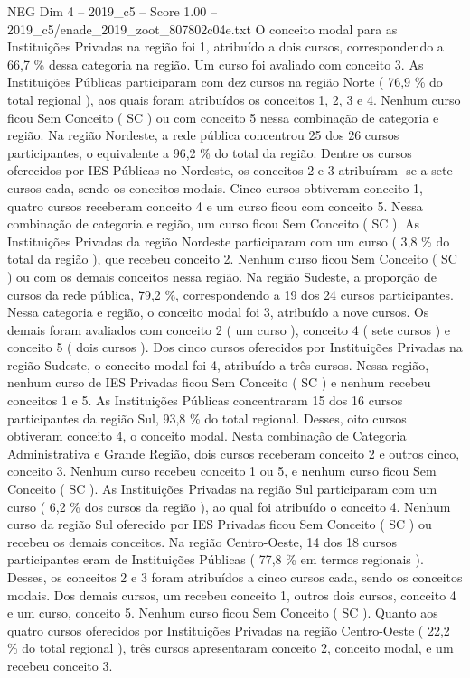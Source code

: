 \begin{textsample}{NEG Dim 4 – 2019\_c5 – Score 1.00 – 2019\_c5/enade\_2019\_zoot\_807802c04e.txt}
O conceito modal para as Instituições Privadas na região foi 1, atribuído a dois cursos, correspondendo a 66,7 \% dessa categoria na região.
Um curso foi avaliado com conceito 3.
As Instituições Públicas participaram com dez cursos na região Norte ( 76,9 \% do total regional ), aos quais foram atribuídos os conceitos 1, 2, 3 e 4.
Nenhum curso ficou Sem Conceito ( SC ) ou com conceito 5 nessa combinação de categoria e região.
Na região Nordeste, a rede pública concentrou 25 dos 26 cursos participantes, o equivalente a 96,2 \% do total da região.
Dentre os cursos oferecidos por IES Públicas no Nordeste, os conceitos 2 e 3 atribuíram -se a sete cursos cada, sendo os conceitos modais.
Cinco cursos obtiveram conceito 1, quatro cursos receberam conceito 4 e um curso ficou com conceito 5.
Nessa combinação de categoria e região, um curso ficou Sem Conceito ( SC ).
As Instituições Privadas da região Nordeste participaram com um curso ( 3,8 \% do total da região ), que recebeu conceito 2.
Nenhum curso ficou Sem Conceito ( SC ) ou com os demais conceitos nessa região.
Na região Sudeste, a proporção de cursos da rede pública, 79,2 \%, correspondendo a 19 dos 24 cursos participantes.
Nessa categoria e região, o conceito modal foi 3, atribuído a nove cursos.
Os demais foram avaliados com conceito 2 ( um curso ), conceito 4 ( sete cursos ) e conceito 5 ( dois cursos ).
Dos cinco cursos oferecidos por Instituições Privadas na região Sudeste, o conceito modal foi 4, atribuído a três cursos.
Nessa região, nenhum curso de IES Privadas ficou Sem Conceito ( SC ) e nenhum recebeu conceitos 1 e 5.
As Instituições Públicas concentraram 15 dos 16 cursos participantes da região Sul, 93,8 \% do total regional.
Desses, oito cursos obtiveram conceito 4, o conceito modal.
Nesta combinação de Categoria Administrativa e Grande Região, dois cursos receberam conceito 2 e outros cinco, conceito 3.
Nenhum curso recebeu conceito 1 ou 5, e nenhum curso ficou Sem Conceito ( SC ).
As Instituições Privadas na região Sul participaram com um curso ( 6,2 \% dos cursos da região ), ao qual foi atribuído o conceito 4.
Nenhum curso da região Sul oferecido por IES Privadas ficou Sem Conceito ( SC ) ou recebeu os demais conceitos.
Na região Centro-Oeste, 14 dos 18 cursos participantes eram de Instituições Públicas ( 77,8 \% em termos regionais ).
Desses, os conceitos 2 e 3 foram atribuídos a cinco cursos cada, sendo os conceitos modais.
Dos demais cursos, um recebeu conceito 1, outros dois cursos, conceito 4 e um curso, conceito 5.
Nenhum curso ficou Sem Conceito ( SC ).
Quanto aos quatro cursos oferecidos por Instituições Privadas na região Centro-Oeste ( 22,2 \% do total regional ), três cursos apresentaram conceito 2, conceito modal, e um recebeu conceito 3.

\end{textsample}
